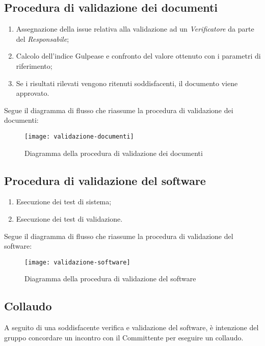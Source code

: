 \documentclass[../NormediProgetto.tex]{subfiles}
\begin{document}
\subsection{Procedura di validazione dei documenti}

\begin{enumerate}
    \item Assegnazione della issue relativa alla validazione ad un \textit{Verificatore} da parte del \textit{Responsabile};
    
    \item Calcolo dell'indice Gulpease e confronto del valore ottenuto con i parametri di riferimento;
    
    \item Se i risultati rilevati vengono ritenuti soddisfacenti, il documento viene approvato.
\end{enumerate}
    
Segue il diagramma di flusso che riassume la procedura di validazione dei documenti:

\begin{figure}[H]
	\texttt{[image: validazione-documenti]}
	\centering
	\caption{Diagramma della procedura di validazione dei documenti}
\end{figure}

\subsection{Procedura di validazione del software}

\begin{enumerate}
    \item Esecuzione dei test di sistema;
    
    \item Esecuzione dei test di validazione.
\end{enumerate}
    
Segue il diagramma di flusso che riassume la procedura di validazione del software:

\begin{figure}[H]
	\texttt{[image: validazione-software]}
	\centering
	\caption{Diagramma della procedura di validazione del software}
\end{figure}

\subsection{Collaudo}

A seguito di una soddisfacente verifica e validazione del software, è intenzione del gruppo concordare un incontro con il Committente per eseguire un collaudo.
\end{document}
